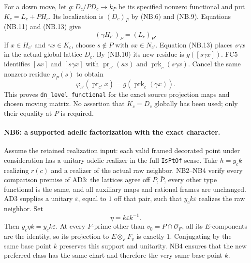 \documentclass[11pt,a4paper]{article}
\numberwithin{equation}{section}
\theoremstyle{remark}\newtheorem{remark}[theorem]{Remark}
\begin{document}
For a down move, let $g:D_c/PD_c\to k_P$ be its specified nonzero
functional and put $K_c=L_c+PH_c$. Its localization is $(D_c)_P$
by (NB.6) and (NB.9). Equations (NB.11) and (NB.13) give
\[
                         (\gamma H_{c'})_P=(L_c)_P. \tag{NB.16}
\]
If $x\in H_{c'}$ and $\gamma x\in K_c$, choose $s\notin P$ with
$sx\in N_{c'}$. Equation (NB.13) places $s\gamma x$ in the actual
global lattice $D_c$. By (NB.10) its new residue is $g([s\gamma x])$.
FC5 identifies $[sx]$ and $[s\gamma x]$ with
$\operatorname{pr}_{c'}(sx)$ and $\operatorname{prk}_c(s\gamma x)$.
Cancel the same nonzero residue $\rho_P(s)$ to obtain
\[
 \varphi_{c'}(\operatorname{pr}_{c'}x)
                   =g(\operatorname{prk}_c(\gamma x)).           \tag{NB.17}
\]
This proves \texttt{dn\_\allowbreak level\_\allowbreak functional} for the exact source
projection maps and chosen moving matrix. No assertion that $K_c=D_c$
globally has been used; only their equality at $P$ is required.

\paragraph{NB6: a supported adelic factorization with the exact character.}
Assume the retained realization input: each valid framed decorated
point under consideration has a unitary adelic realizer in the full
\texttt{IsPtOf} sense. Take $h=y_ck$ realizing $r(c)$ and a realizer
of the actual raw neighbor. NB2--NB4 verify every comparison premise
of AD3: the lattices agree off $P,\bar P$, every other type functional
is the same, and all auxiliary maps and rational frames are unchanged.
AD3 supplies a unitary $\varepsilon$, equal to $1$ off that pair,
such that $y_ck\varepsilon$ realizes the raw neighbor. Set
\[
                         \eta=k\varepsilon k^{-1}. \tag{NB.18}
\]
Then $y_c\eta k=y_ck\varepsilon$. At every $F$-prime other than
$v_0=P\cap\mathcal O_F$, all its $E$-components are the identity,
so its projection to $E\otimes_FF_v$ is exactly $1$.
Conjugating by the same base point $k$ preserves this support and
unitarity. NB4 ensures that the new preferred class has the same
chart and therefore the very same base point $k$.
\end{document}
